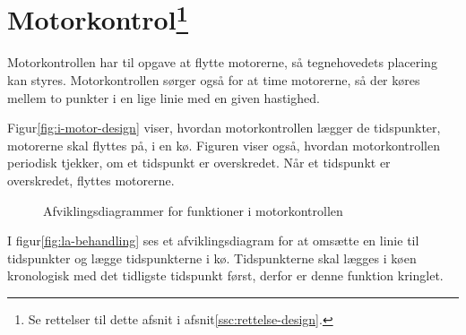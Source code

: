 \section[Motorkontrol (med kø)]{Motorkontrol\footnote{Se rettelser til
    dette afsnit i afsnit\vref{ssc:rettelse-design}.}}




Motorkontrollen har til opgave at flytte motorerne, så tegnehovedets
placering kan styres. Motorkontrollen sørger også for at time
motorerne, så der køres mellem to punkter i en lige linie med en given
hastighed.

Figur\vref{fig:i-motor-design} viser, hvordan motorkontrollen lægger
de tidspunkter, motorerne skal flyttes på, i en kø. Figuren viser
også, hvordan motorkontrollen periodisk tjekker, om et tidspunkt er
overskredet. Når et tidspunkt er overskredet, flyttes motorerne.

\begin{figure}[htbp]
  \centering
  \qquad
  \caption{Afviklingsdiagrammer for funktioner i motorkontrollen}
  \label{fig:i-motor-design}
\end{figure}


I figur\vref{fig:la-behandling} ses et afviklingsdiagram for at
omsætte en linie til tidspunkter og lægge tidspunkterne i
kø. Tidspunkterne skal lægges i køen kronologisk med det tidligste
tidspunkt først, derfor er denne funktion kringlet.

